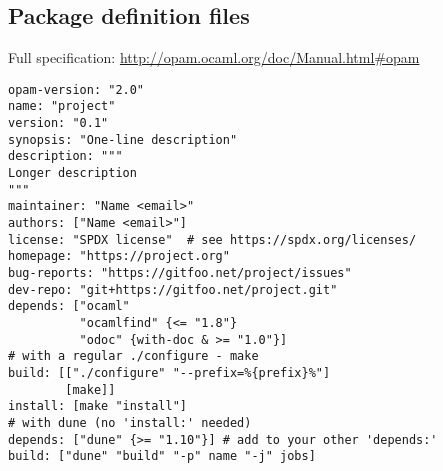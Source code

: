 \documentclass[colcode]{../common/ocaml-cs}
\begin{document}
\begin{multicols}{3}


\pagebreak



\section{Package definition files}
\lstset{language=opam-file}

Full specification:
\hfill\url{http://opam.ocaml.org/doc/Manual.html#opam}\hfill\null


\begin{lstlisting}
opam-version: "2.0"
name: "project"
version: "0.1"
synopsis: "One-line description"
description: """
Longer description
"""
maintainer: "Name <email>"
authors: ["Name <email>"]
license: "SPDX license"  # see https://spdx.org/licenses/
homepage: "https://project.org"
bug-reports: "https://gitfoo.net/project/issues"
dev-repo: "git+https://gitfoo.net/project.git"
depends: ["ocaml"
          "ocamlfind" {<= "1.8"}
          "odoc" {with-doc & >= "1.0"}]
# with a regular ./configure - make
build: [["./configure" "--prefix=%{prefix}%"]
        [make]]
install: [make "install"]
# with dune (no 'install:' needed)
depends: ["dune" {>= "1.10"}] # add to your other 'depends:'
build: ["dune" "build" "-p" name "-j" jobs]
\end{lstlisting}

\columnbreak

\end{multicols}
\end{document}
